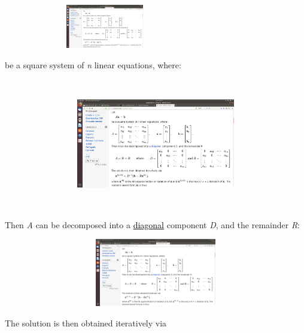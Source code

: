 \documentclass[a4paper]{article}
\begin{document}
\begin{center}
\includegraphics[width=8.844cm,height=1.914cm]{csn221Report-img002.png}
\end{center}

\bigskip

be a square system of \textit{n} linear equations, where:


\bigskip

\ 

\begin{center}
\includegraphics[width=16.905cm,height=3.895cm]{csn221Report-img002.png}
\end{center}
 \includegraphics[width=0.041cm,height=0.041cm]{csn221Report-img003.png} 


\bigskip


\bigskip


\bigskip


\bigskip

Then \textit{A} can be decomposed into a
\href{https://en.wikipedia.org/wiki/Diagonal_matrix}{\textcolor{black}{diagonal}} component \textit{D}, and the
remainder \textit{R}: 



\begin{center}
\includegraphics[width=18.376cm,height=2.969cm]{csn221Report-img002.png}
\end{center}
The solution is then obtained iteratively via 
\end{document}
